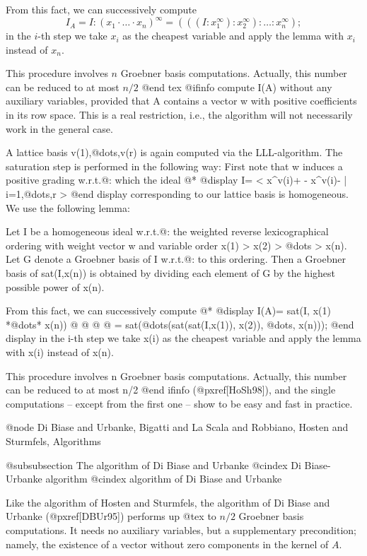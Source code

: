 From this fact, we can successively compute
$$ I_A= I:(x_1\cdot\ldots\cdot x_n)^\infty
=(((I:x_1^\infty):x_2^\infty):\ldots :x_n^\infty); $$
in the $i$-th step we take $x_i$ as the cheapest variable and apply the
lemma with $x_i$ instead of $x_n$.

This procedure involves $n$ Groebner basis computations. Actually, this
number can be reduced to at most $n/2$
@end tex
@ifinfo
compute I(A) without any auxiliary variables, provided that A contains a vector w
with positive coefficients in its row space. This is a real restriction,
i.e., the algorithm will not necessarily work in the general case.

A lattice basis v(1),@dots{},v(r) is again computed via the
LLL-algorithm. The saturation step is performed in the following way:
First note that w induces a positive grading w.r.t.@: which the ideal @*
@display
I= < x^v(i)+ - x^v(i)- | i=1,@dots{},r >
@end display
corresponding to our lattice basis is homogeneous. We use the following
lemma:

Let I be a homogeneous ideal w.r.t.@: the weighted reverse lexicographical
ordering with weight vector w and variable order x(1) > x(2) > @dots{} >
x(n). Let G denote a Groebner basis of I w.r.t.@: to this ordering.  Then
a Groebner basis of sat(I,x(n)) is obtained by dividing each element
of G by the highest possible power of x(n).

From this fact, we can successively compute @*
@display
I(A)= sat(I, x(1) *@dots{}* x(n))
@ @ @ @ = sat(@dots{}(sat(sat(I,x(1)), x(2)), @dots{}, x(n)));
@end display
in the i-th step we take x(i) as the cheapest variable and apply the
lemma with x(i) instead of x(n).

This procedure involves n Groebner basis computations. Actually, this
number can be reduced to at most n/2
@end ifinfo
(@pxref{[HoSh98]}), and the single
computations -- except from the first one -- show to be easy and fast in
practice.

@node Di Biase and Urbanke, Bigatti and La Scala and Robbiano, Hosten and Sturmfels, Algorithms

@subsubsection The algorithm of Di Biase and Urbanke
@cindex Di Biase-Urbanke algorithm
@cindex algorithm of Di Biase and Urbanke

Like the algorithm of Hosten and Sturmfels, the algorithm of Di Biase
and Urbanke (@pxref{[DBUr95]}) performs up
@tex
to $n/2$ Groebner basis
computations. It needs no auxiliary variables, but a supplementary
precondition; namely, the existence of a vector without zero components
in the kernel of $A$.

